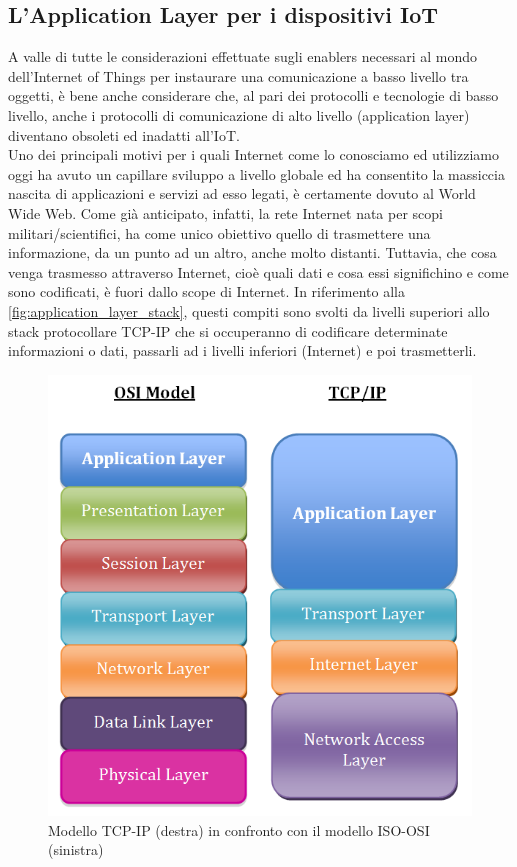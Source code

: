 \subsection{L'Application Layer per i dispositivi IoT}
A valle di tutte le considerazioni effettuate sugli enablers necessari al mondo dell'Internet of Things per instaurare una comunicazione a basso livello tra oggetti, è bene anche considerare che, al pari dei protocolli e tecnologie di basso livello, anche i protocolli di comunicazione di alto livello (application layer) diventano obsoleti ed inadatti all'IoT.\\
Uno dei principali motivi per i quali Internet come lo conosciamo ed utilizziamo oggi ha avuto un capillare sviluppo a livello globale ed ha consentito la massiccia nascita di applicazioni e servizi ad esso legati, è certamente dovuto al World Wide Web. Come già anticipato, infatti, la rete Internet nata per scopi militari/scientifici, ha come unico obiettivo quello di trasmettere una informazione, da un punto ad un altro, anche molto distanti.
Tuttavia, che cosa venga trasmesso attraverso Internet, cioè quali dati e cosa essi significhino e come sono codificati, è fuori dallo scope di Internet. In riferimento alla \autoref{fig:application_layer_stack}, questi compiti sono svolti da livelli superiori allo stack protocollare TCP-IP che si occuperanno di codificare determinate informazioni o dati, passarli ad i livelli inferiori (Internet) e poi trasmetterli.
\begin{figure}
	\begin{center}
		\includegraphics[width=0.6\columnwidth]{images/application_layer_stack.png}
	\end{center}
	\caption{Modello TCP-IP (destra) in confronto con il modello ISO-OSI (sinistra) \cite{book:wikipedia}}
	\label{fig:application_layer_stack}
\end{figure}
